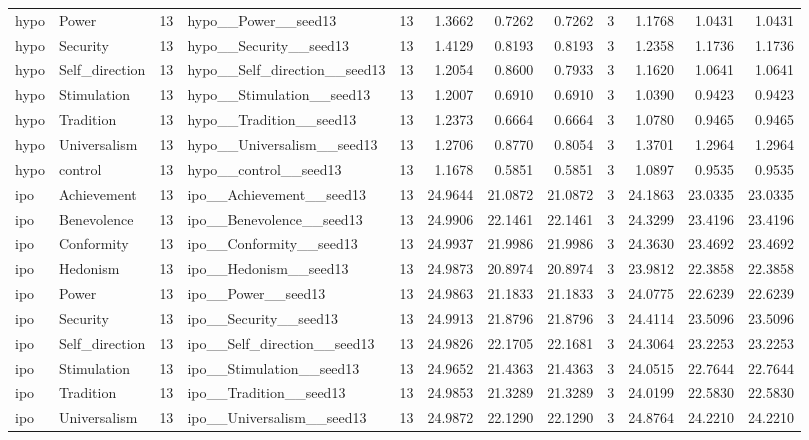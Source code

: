 \begin{tabular}{llrlrrrrrrrr}
hypo & Power & 13 & hypo\_\_Power\_\_seed13 & 13 & 1.3662 & 0.7262 & 0.7262 & 3 & 1.1768 & 1.0431 & 1.0431 \\
hypo & Security & 13 & hypo\_\_Security\_\_seed13 & 13 & 1.4129 & 0.8193 & 0.8193 & 3 & 1.2358 & 1.1736 & 1.1736 \\
hypo & Self\_direction & 13 & hypo\_\_Self\_direction\_\_seed13 & 13 & 1.2054 & 0.8600 & 0.7933 & 3 & 1.1620 & 1.0641 & 1.0641 \\
hypo & Stimulation & 13 & hypo\_\_Stimulation\_\_seed13 & 13 & 1.2007 & 0.6910 & 0.6910 & 3 & 1.0390 & 0.9423 & 0.9423 \\
hypo & Tradition & 13 & hypo\_\_Tradition\_\_seed13 & 13 & 1.2373 & 0.6664 & 0.6664 & 3 & 1.0780 & 0.9465 & 0.9465 \\
hypo & Universalism & 13 & hypo\_\_Universalism\_\_seed13 & 13 & 1.2706 & 0.8770 & 0.8054 & 3 & 1.3701 & 1.2964 & 1.2964 \\
hypo & control & 13 & hypo\_\_control\_\_seed13 & 13 & 1.1678 & 0.5851 & 0.5851 & 3 & 1.0897 & 0.9535 & 0.9535 \\
ipo & Achievement & 13 & ipo\_\_Achievement\_\_seed13 & 13 & 24.9644 & 21.0872 & 21.0872 & 3 & 24.1863 & 23.0335 & 23.0335 \\
ipo & Benevolence & 13 & ipo\_\_Benevolence\_\_seed13 & 13 & 24.9906 & 22.1461 & 22.1461 & 3 & 24.3299 & 23.4196 & 23.4196 \\
ipo & Conformity & 13 & ipo\_\_Conformity\_\_seed13 & 13 & 24.9937 & 21.9986 & 21.9986 & 3 & 24.3630 & 23.4692 & 23.4692 \\
ipo & Hedonism & 13 & ipo\_\_Hedonism\_\_seed13 & 13 & 24.9873 & 20.8974 & 20.8974 & 3 & 23.9812 & 22.3858 & 22.3858 \\
ipo & Power & 13 & ipo\_\_Power\_\_seed13 & 13 & 24.9863 & 21.1833 & 21.1833 & 3 & 24.0775 & 22.6239 & 22.6239 \\
ipo & Security & 13 & ipo\_\_Security\_\_seed13 & 13 & 24.9913 & 21.8796 & 21.8796 & 3 & 24.4114 & 23.5096 & 23.5096 \\
ipo & Self\_direction & 13 & ipo\_\_Self\_direction\_\_seed13 & 13 & 24.9826 & 22.1705 & 22.1681 & 3 & 24.3064 & 23.2253 & 23.2253 \\
ipo & Stimulation & 13 & ipo\_\_Stimulation\_\_seed13 & 13 & 24.9652 & 21.4363 & 21.4363 & 3 & 24.0515 & 22.7644 & 22.7644 \\
ipo & Tradition & 13 & ipo\_\_Tradition\_\_seed13 & 13 & 24.9853 & 21.3289 & 21.3289 & 3 & 24.0199 & 22.5830 & 22.5830 \\
ipo & Universalism & 13 & ipo\_\_Universalism\_\_seed13 & 13 & 24.9872 & 22.1290 & 22.1290 & 3 & 24.8764 & 24.2210 & 24.2210 \\

\end{tabular}
